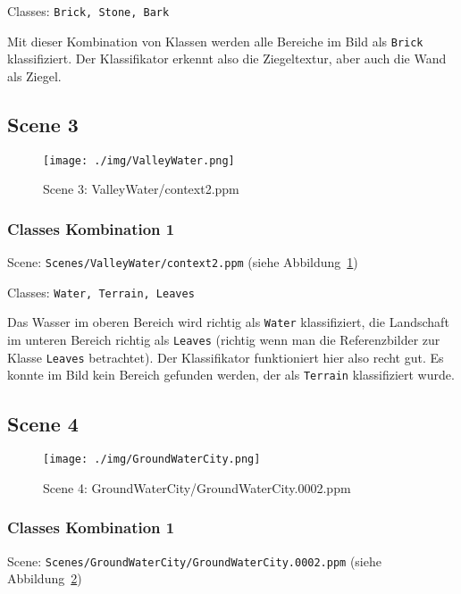 Classes: \texttt{Brick, Stone, Bark}

Mit dieser Kombination von Klassen werden alle Bereiche im Bild als \texttt{Brick} klassifiziert. Der Klassifikator erkennt also die Ziegeltextur, aber auch die Wand als Ziegel.


\subsection{Scene 3}

\begin{figure}[htb!]
 \centering
 \texttt{[image: ./img/ValleyWater.png]}
 \caption{Scene 3: ValleyWater/context2.ppm}
 \label{fig:VW_context2}
\end{figure}

\subsubsection{Classes Kombination 1}

Scene: \texttt{Scenes/ValleyWater/context2.ppm} (siehe Abbildung~\ref{fig:VW_context2})

Classes: \texttt{Water, Terrain, Leaves}

Das Wasser im oberen Bereich wird richtig als \texttt{Water} klassifiziert, die Landschaft im unteren Bereich richtig als \texttt{Leaves} (richtig wenn man die Referenzbilder zur Klasse \texttt{Leaves} betrachtet). Der Klassifikator funktioniert hier also recht gut. Es konnte im Bild kein Bereich gefunden werden, der als \texttt{Terrain} klassifiziert wurde.



\subsection{Scene 4}

\begin{figure}[htb!]
 \centering
 \texttt{[image: ./img/GroundWaterCity.png]}
 \caption{Scene 4: GroundWaterCity/GroundWaterCity.0002.ppm}
 \label{fig:GWC}
\end{figure}

\subsubsection{Classes Kombination 1}

Scene: \texttt{Scenes/GroundWaterCity/GroundWaterCity.0002.ppm} (siehe Abbildung~\ref{fig:GWC})

